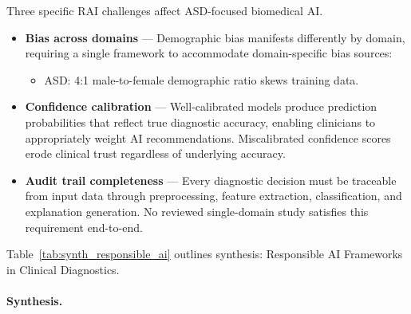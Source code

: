 Three specific RAI challenges affect ASD-focused biomedical AI.

\begin{itemize}[leftmargin=*, itemsep=3pt]
  \item \textbf{Bias across domains} --- Demographic bias manifests differently by domain, requiring a single framework to accommodate domain-specific bias sources:
    \begin{itemize}[leftmargin=1.5em, itemsep=2pt]
      \item ASD: 4:1 male-to-female demographic ratio skews training data.
    \end{itemize}
  \item \textbf{Confidence calibration} --- Well-calibrated models produce prediction probabilities that reflect true diagnostic accuracy, enabling clinicians to appropriately weight AI recommendations. Miscalibrated confidence scores erode clinical trust regardless of underlying accuracy.
  \item \textbf{Audit trail completeness} --- Every diagnostic decision must be traceable from input data through preprocessing, feature extraction, classification, and explanation generation. No reviewed single-domain study satisfies this requirement end-to-end.
\end{itemize}

\noindent Table~\ref{tab:synth_responsible_ai} outlines synthesis: Responsible AI Frameworks in Clinical Diagnostics.

\paragraph{Synthesis.}


